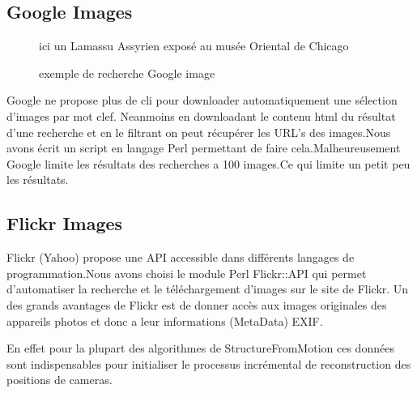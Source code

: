 \documentclass[a4paper,10pt,french]{sphinxhowto}
\begin{document}
\subsection{\textbf{Google Images}}
\label{collection:google-images}\begin{figure}[htbp]
\centering
\capstart

\caption{exemple de recherche Google image}{\small 
ici un Lamassu Assyrien exposé au musée Oriental de Chicago
}\end{figure}

Google ne propose plus de cli pour downloader automatiquement une sélection d'images par mot clef. Neanmoins en downloadant le contenu html du résultat d'une recherche et en le filtrant on peut récupérer les URL's des images.Nous avons écrit un script en langage Perl permettant de faire cela.Malheureusement Google limite les résultats des recherches a 100 images.Ce qui limite un petit peu les résultats.


\subsection{\textbf{Flickr Images}}
\label{collection:flickr-images}
Flickr (Yahoo) propose une API accessible dans différents langages de programmation.Nous avons choisi le module Perl Flickr::API qui permet d'automatiser la recherche et le téléchargement d'images sur le site de Flickr. Un des grands avantages de Flickr est de donner accès aux images originales des appareils photos et donc a leur informations (MetaData) EXIF.

En effet pour la plupart des algorithmes de StructureFromMotion ces données sont indispensables pour initialiser le processus incrémental de reconstruction des positions de cameras.
\end{document}
